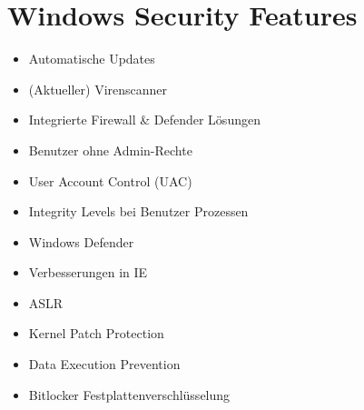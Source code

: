 \section{Windows Security Features}
\begin{itemize}
    \item Automatische Updates
    \item (Aktueller) Virenscanner
    \item Integrierte Firewall \& Defender Lösungen
    \item Benutzer ohne Admin-Rechte
    \item User Account Control (UAC)
    \item Integrity Levels bei Benutzer Prozessen
    \item Windows Defender
    \item Verbesserungen in IE
    \item ASLR
    \item Kernel Patch Protection
    \item Data Execution Prevention
    \item Bitlocker Festplattenverschlüsselung
\end{itemize}

